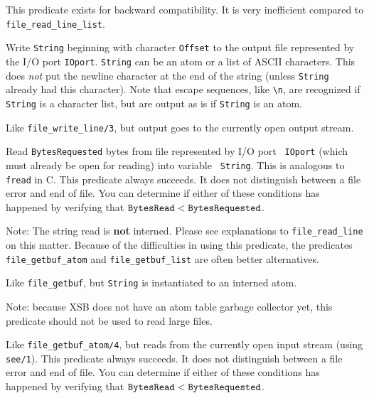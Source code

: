 \begin{description}
    This predicate exists for backward compatibility. It is very
    inefficient compared to \verb|file_read_line_list|.

   Write {\tt String} beginning with character {\tt Offset}  to the output
   file represented by the I/O port {\tt IOport}. {\tt String} can
   be an atom or a list of ASCII characters. This does \emph{not} put the
   newline character at the end of the string (unless {\tt String} already
   had this character). Note that escape sequences, like \verb|\n|, are
   recognized if {\tt String} is a character list, but are output as is if
   {\tt String} is an atom.
   
   Like \verb|file_write_line/3|, but output goes to the currently open
   output stream.


Read {\tt BytesRequested} bytes from file represented by I/O port {\tt
  IOport} (which must already be open for reading) into variable {\tt
  String}. This is analogous to {\tt fread} in C.  This predicate always
succeeds. It does not distinguish between a file error and end of file.
You can determine if either of these conditions has happened by verifying
that $\tt BytesRead < BytesRequested$.

Note: The string read is {\bf not} interned. Please see explanations to
\verb|file_read_line| on this matter. Because of the difficulties in using
this predicate, the predicates \verb|file_getbuf_atom| and
\verb|file_getbuf_list| are often better alternatives.

Like \verb|file_getbuf|, but {\tt String} is instantiated to an interned atom.

Note: because XSB does not have an atom table garbage collector yet, this
predicate should not be used to read large files.

Like \verb|file_getbuf_atom/4|, but reads from the currently open input stream
(using {\tt see/1}). This predicate always
succeeds. It does not distinguish between a file error and end of file.
You can determine if either of these conditions has happened by verifying
that $\tt BytesRead < BytesRequested$.


\end{description}
